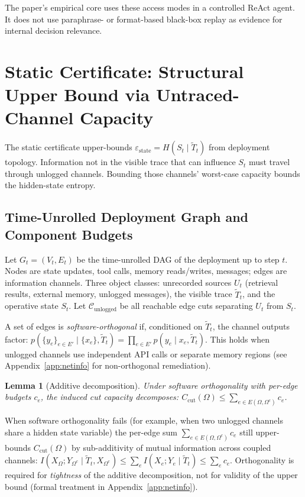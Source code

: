 \documentclass{article}
\newtheorem{lemma}{Lemma}
\begin{document}
The paper's empirical core uses these access modes in a controlled ReAct agent. It does not use paraphrase- or format-based black-box replay as evidence for internal decision relevance.

\section{Static Certificate: Structural Upper Bound via Untraced-Channel Capacity}
\label{sec:static-cert}

The static certificate upper-bounds $\varepsilon_\text{state} = H(S_t \mid \tilde T_t)$ from deployment topology. Information not in the visible trace that can influence $S_t$ must travel through unlogged channels. Bounding those channels' worst-case capacity bounds the hidden-state entropy.

\subsection{Time-Unrolled Deployment Graph and Component Budgets}

Let $G_t = (V_t, E_t)$ be the time-unrolled DAG of the deployment up to step $t$. Nodes are state updates, tool calls, memory reads/writes, messages; edges are information channels. Three object classes: unrecorded sources $U_t$ (retrieval results, external memory, unlogged messages), the visible trace $\tilde T_t$, and the operative state $S_t$. Let $\mathcal{C}_\text{unlogged}$ be all reachable edge cuts separating $U_t$ from $S_t$.

A set of edges is \emph{software-orthogonal} if, conditioned on $\tilde T_t$, the channel outputs factor: $p(\{y_e\}_{e \in E'} \mid \{x_e\}, \tilde T_t) = \prod_{e \in E'} p(y_e \mid x_e, \tilde T_t)$. This holds when unlogged channels use independent API calls or separate memory regions (see Appendix~\ref{app:netinfo} for non-orthogonal remediation).

\begin{lemma}[Additive decomposition]
\label{lem:ortho-decomp}
Under software orthogonality with per-edge budgets $c_e$, the induced cut capacity decomposes: $C_\text{cut}(\Omega) \leq \sum_{e \in E(\Omega, \Omega^c)} c_e$.
\end{lemma}

When software orthogonality fails (for example, when two unlogged channels share a hidden state variable) the per-edge sum $\sum_{e \in E(\Omega, \Omega^c)} c_e$ still upper-bounds $C_\text{cut}(\Omega)$ by sub-additivity of mutual information across coupled channels: $I(X_\Omega; Y_{\Omega^c} \mid \tilde T_t, X_{\Omega^c}) \leq \sum_e I(X_e; Y_e \mid \tilde T_t) \leq \sum_e c_e$. Orthogonality is required for \emph{tightness} of the additive decomposition, not for validity of the upper bound (formal treatment in Appendix~\ref{app:netinfo}).
\end{document}
